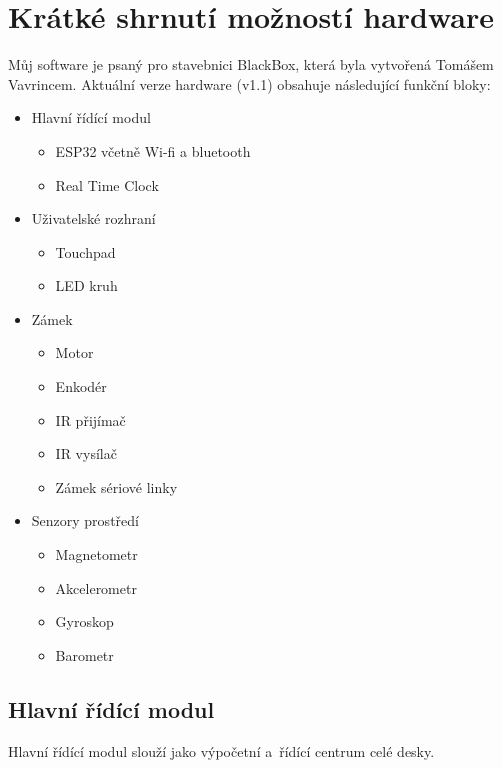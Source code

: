 \newpage
\chapter{Krátké shrnutí možností hardware}
Můj software je psaný pro stavebnici BlackBox, která byla vytvořená Tomášem Vavrincem.%
Aktuální verze hardware (v1.1) obsahuje následující funkční bloky:

\begin{itemize}[noitemsep]
    \item Hlavní řídící modul
        \begin{itemize}[noitemsep]
            \item ESP32 včetně Wi-fi a bluetooth
            \item Real Time Clock
        \end{itemize}
    \item Uživatelské rozhraní
          \begin{itemize}[noitemsep]
              \item Touchpad
              \item LED kruh
          \end{itemize}
    \item Zámek
        \begin{itemize}[noitemsep]
            \item Motor
            \item Enkodér
            \item IR přijímač
            \item IR vysílač
            \item Zámek sériové linky
        \end{itemize}
    \item Senzory prostředí
          \begin{itemize}[noitemsep]
              \item Magnetometr
              \item Akcelerometr
              \item Gyroskop
              \item Barometr
          \end{itemize}
\end{itemize}

\newpage
\section{Hlavní řídící modul}
Hlavní řídící modul slouží jako výpočetní a~řídící centrum celé desky.

